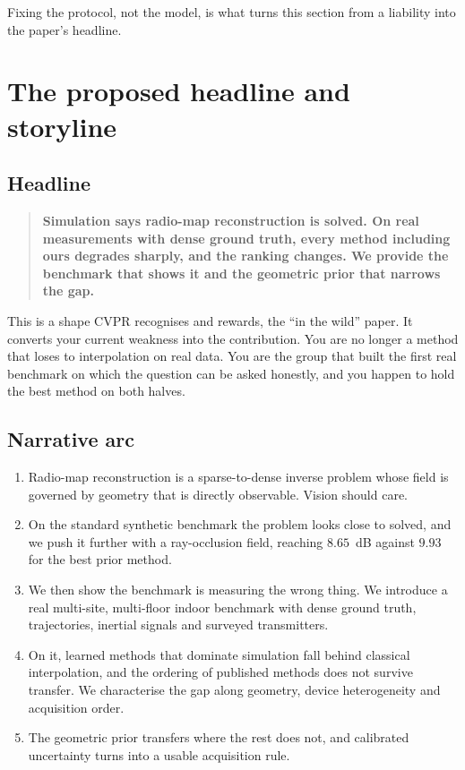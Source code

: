 \documentclass[11pt,a4paper]{article}
\begin{document}
Fixing the protocol, not the model, is what turns this section from a liability into the
paper's headline.

\section{The proposed headline and storyline}

\subsection{Headline}

\begin{quote}
\textbf{Simulation says radio-map reconstruction is solved. On real measurements with
dense ground truth, every method including ours degrades sharply, and the ranking
changes. We provide the benchmark that shows it and the geometric prior that narrows the
gap.}
\end{quote}

This is a shape CVPR recognises and rewards, the ``in the wild'' paper. It converts your
current weakness into the contribution. You are no longer a method that loses to
interpolation on real data. You are the group that built the first real benchmark on
which the question can be asked honestly, and you happen to hold the best method on both
halves.

\subsection{Narrative arc}

\begin{enumerate}
\item Radio-map reconstruction is a sparse-to-dense inverse problem whose field is
governed by geometry that is directly observable. Vision should care.
\item On the standard synthetic benchmark the problem looks close to solved, and we push
it further with a ray-occlusion field, reaching $8.65$~dB against $9.93$ for the best
prior method.
\item We then show the benchmark is measuring the wrong thing. We introduce a real
multi-site, multi-floor indoor benchmark with dense ground truth, trajectories, inertial
signals and surveyed transmitters.
\item On it, learned methods that dominate simulation fall behind classical
interpolation, and the ordering of published methods does not survive transfer. We
characterise the gap along geometry, device heterogeneity and acquisition order.
\item The geometric prior transfers where the rest does not, and calibrated uncertainty
turns into a usable acquisition rule.
\end{enumerate}
\end{document}
